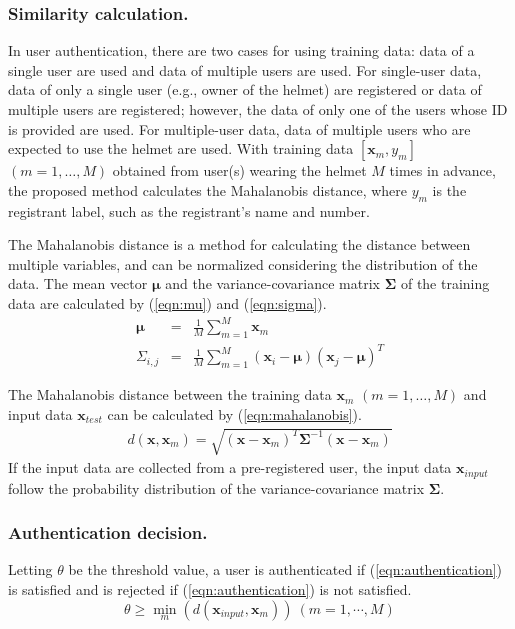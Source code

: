 \documentclass[english,preprint,JIP]{ipsj}
\begin{document}
\subsubsection{Similarity calculation.}
In user authentication, there are two cases for using training data: data of a single user are used and data of multiple users are used. For single-user data, data of only a single user (e.g., owner of the helmet) are registered or data of multiple users are registered; however, the data of only one of the users whose ID is provided are used. For multiple-user data, data of multiple users who are expected to use the helmet are used. With training data $[\bm{x}_m,y_m]$ $(m=1,\dots, M)$ obtained from user(s) wearing the helmet $M$ times in advance, the proposed method calculates the Mahalanobis distance, where $y_m$ is the registrant label, such as the registrant's name and number.\par

The Mahalanobis distance is a method for calculating the distance between multiple variables, and can be normalized considering the distribution of the data. The mean vector $\bm{\mu}$ and the variance-covariance matrix $\bm{\Sigma}$ of the training data are calculated by (\ref{eqn:mu}) and (\ref{eqn:sigma}).
\begin{eqnarray}
\label{eqn:mu}
  \bm{\mu} &=& \frac{1}{M}\sum_{m=1}^{M}\bm{x}_m \\
\label{eqn:sigma}
  \Sigma_{i,j} &=& \frac{1}{M}\sum_{m=1}^{M}(\bm{x}_i-\bm{\mu})(\bm{x}_j-\bm{\mu})^T
\end{eqnarray}
 
The Mahalanobis distance between the training data $\bm{x}_m$ $(m=1,\dots, M)$ and input data $\bm{x}_{test}$ can be calculated by (\ref{eqn:mahalanobis}).
\begin{eqnarray}
\label{eqn:mahalanobis}
  d(\bm{x},\bm{x}_m) = \sqrt{(\bm{x}-\bm{x}_m)^{T}\bm{\Sigma}^{-1}(\bm{x}-\bm{x}_m)}
\end{eqnarray}
If the input data are collected from a pre-registered user, the input data $\bm{x}_{input}$ follow the probability distribution of the variance-covariance matrix $\bm{\Sigma}$.


\subsubsection{Authentication decision.}
\label{sec:authentication_decision}
Letting $\theta$ be the threshold value, a user is authenticated if (\ref{eqn:authentication}) is satisfied and is rejected if (\ref{eqn:authentication}) is not satisfied.
\begin{equation}
\label{eqn:authentication}
  \theta \geq \min_m(d(\bm{x}_{input},\bm{x}_m))~(m=1,\cdots,M)
\end{equation}
\end{document}
